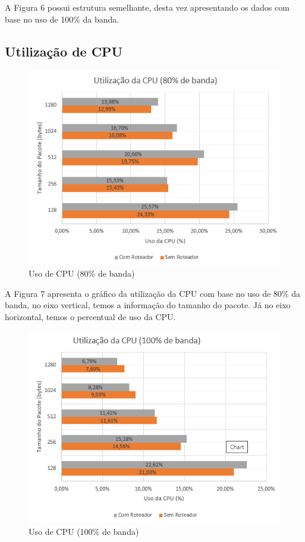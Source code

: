 \documentclass[12pt]{article}
\begin{document}
A Figura 6 possui estrutura semelhante, desta vez apresentando os dados com base no uso de 100\% da banda.

\subsection{Utilização de CPU}

\begin{figure}[ht]
\centering
\includegraphics[width=.9\textwidth]{uso_cpu_80.png}
\caption{Uso de CPU (80\% de banda)}
\label{fig:fig_com_roteador}
\end{figure}

A Figura 7 apresenta o gráfico da utilização da CPU com base no uso de 80\% da banda, no eixo vertical, temos a informação do tamanho do pacote. Já no eixo horizontal, temos o percentual de uso da CPU.

\begin{figure}[H]
\centering
\includegraphics[width=.9\textwidth]{uso_cpu_100.png}
\caption{Uso de CPU (100\% de banda)}
\label{fig:fig_com_roteador}
\end{figure}
\end{document}
